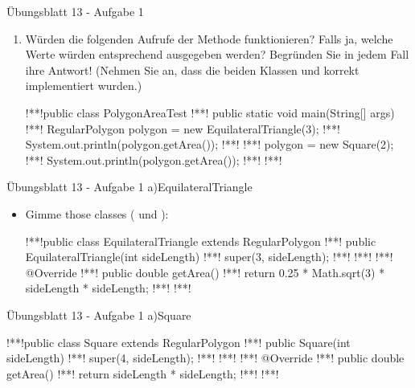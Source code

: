 \begin{frame}[c,fragile]{Übungsblatt 13 - Aufgabe 1}
\small\begin{enumerate}
    \item<2->[6.] Würden die folgenden Aufrufe der Methode  funktionieren? Falls ja, welche Werte würden entsprechend ausgegeben werden? Begründen Sie in jedem Fall ihre Antwort!
    (Nehmen Sie an, dass die beiden Klassen  und  korrekt implementiert wurden.)
\begin{plainjava}[morekeywords={[3]{PolygonTest,RegularPolygon,PolygonAreaTest,EquilateralTriangle,Square}}]
!**!public class PolygonAreaTest {
!**!    public static void main(String[] args) {
!**!        RegularPolygon polygon = new EquilateralTriangle(3);
!**!        System.out.println(polygon.getArea());
!**!
!**!        polygon = new Square(2);
!**!        System.out.println(polygon.getArea());
!**!    }
!**!}
\end{plainjava}
    \end{enumerate}
\end{frame}
\fi

\begin{frame}[t,fragile]{Übungsblatt 13 - Aufgabe 1 a)\hfill EquilateralTriangle}
\SetupLstHl\begin{itemize}[<+(1)->]
    \item Gimme those classes ( und ):
\begin{plainjava}[morekeywords={[3]{PolygonTest,RegularPolygon,EquilateralTriangle,Square}},add to literate={@Override}{{\color{gray}@Override}}9]
!**!public class EquilateralTriangle extends RegularPolygon {
!**!    public EquilateralTriangle(int sideLength) {
!**!        super(3, sideLength);
!**!    }
!**!
!**!    @Override
!**!    public double getArea() {
!**!        return 0.25 * Math.sqrt(3) * sideLength * sideLength;
!**!    }
!**!}
\end{plainjava}
\end{itemize}
\end{frame}

\begin{frame}[c,fragile]{Übungsblatt 13 - Aufgabe 1 a)\hfill Square}
\SetupLstHl
\begin{plainjava}[morekeywords={[3]{PolygonTest,RegularPolygon,EquilateralTriangle,Square}},add to literate={@Override}{{\color{gray}@Override}}9]
!**!public class Square extends RegularPolygon {
!**!    public Square(int sideLength) {
!**!        super(4, sideLength);
!**!    }
!**!
!**!    @Override
!**!    public double getArea() {
!**!        return sideLength * sideLength;
!**!    }
!**!}
\end{plainjava}
\end{frame}


